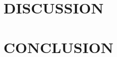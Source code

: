 \documentclass[a4paper, 10pt, conference]{ieeeconf}        %
\begin{document}
\section{DISCUSSION} \label{sec:Discussion}
\section{CONCLUSION} \label{sec:Conclusion}

\lipsum[2-3]\cite{1982AI-Brooks-SymbolicErrorAnalysisBotPlanning}


\end{document}
